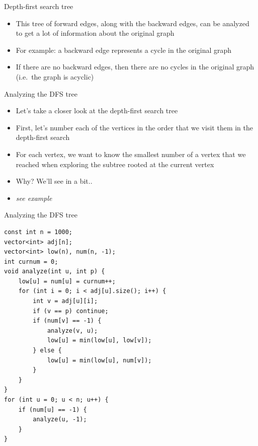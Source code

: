 \documentclass{beamer}
\begin{document}
\begin{frame}[plain]{Depth-first search tree}
    \vspace{30pt}

    \begin{itemize}
        \item This tree of forward edges, along with the backward edges, can be analyzed to get a lot of information about the original graph
        \vspace{10pt}
        \item For example: a backward edge represents a cycle in the original graph
        \item If there are no backward edges, then there are no cycles in the original graph (i.e.\ the graph is acyclic)
    \end{itemize}
\end{frame}

\begin{frame}[plain]{Analyzing the DFS tree}
    \vspace{20pt}
    \begin{itemize}
        \item Let's take a closer look at the depth-first search tree
        \vspace{10pt}
        \item First, let's number each of the vertices in the order that we visit them in the depth-first search
        \item For each vertex, we want to know the smallest number of a vertex that we reached when exploring the subtree rooted at the current vertex
        \vspace{10pt}
        \item Why? We'll see in a bit..
        \vspace{10pt}
        \item \textit{see example}
    \end{itemize}
\end{frame}

\begin{frame}{Analyzing the DFS tree}
    \begin{verbatim}
const int n = 1000;
vector<int> adj[n];
vector<int> low(n), num(n, -1);
int curnum = 0;
void analyze(int u, int p) {
    low[u] = num[u] = curnum++;
    for (int i = 0; i < adj[u].size(); i++) {
        int v = adj[u][i];
        if (v == p) continue;
        if (num[v] == -1) {
            analyze(v, u);
            low[u] = min(low[u], low[v]);
        } else {
            low[u] = min(low[u], num[v]);
        }
    }
}
for (int u = 0; u < n; u++) {
    if (num[u] == -1) {
        analyze(u, -1);
    }
}
    \end{verbatim}
\end{frame}
\end{document}
